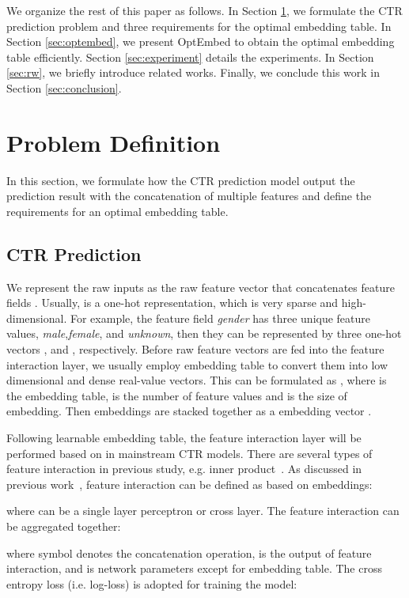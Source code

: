 \documentclass[sigconf]{acmart}
\begin{document}
We organize the rest of this paper as follows. In Section \ref{sec:problem}, we formulate the CTR prediction problem and three requirements for the optimal embedding table. In Section \ref{sec:optembed}, we present OptEmbed to obtain the optimal embedding table efficiently. Section \ref{sec:experiment} details the experiments. In Section \ref{sec:rw}, we briefly introduce related works. Finally, we conclude this work in Section \ref{sec:conclusion}. \section{Problem Definition}
\label{sec:problem}
In this section, we formulate how the CTR prediction model output the prediction result with the concatenation of multiple features and define the requirements for an optimal embedding table.

\subsection{CTR Prediction}
\label{sec:problem:ctr}



We represent the raw inputs as the raw feature vector that concatenates  feature fields . Usually,  is a one-hot representation, which is very sparse and high-dimensional. For example, the feature field \textit{gender} has three unique feature values, \textit{male},\textit{female}, and \textit{unknown}, then they can be represented by three one-hot vectors , and , respectively. Before raw feature vectors are fed into the feature interaction layer, we usually employ embedding table to convert them into low dimensional and dense real-value vectors. This can be formulated as , where  is the embedding table,  is the number of feature values and  is the size of embedding. Then embeddings are stacked together as a embedding vector .

Following learnable embedding table, the feature interaction layer will be performed based on  in mainstream CTR models. There are several types of feature interaction in previous study, e.g. inner product~\cite{DeepFM}. As discussed in previous work~\cite{AutoPI}, feature interaction can be defined as based on embeddings:

where  can be a single layer perceptron or cross layer\cite{DCN}. The feature interaction can be aggregated together:

where symbol  denotes the concatenation operation,  is the output of feature interaction, and  is network parameters except for embedding table. The cross entropy loss (i.e. log-loss) is adopted for training the model:
\end{document}
